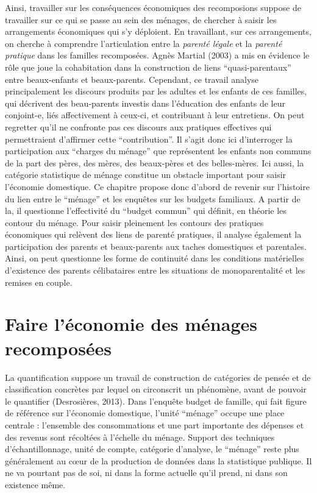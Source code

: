 \documentclass[
  12pt,
]{book}
\begin{document}
Ainsi, travailler sur les conséquences économiques des recomposions
suppose de travailler sur ce qui se passe au sein des ménages, de
chercher à saisir les arrangements économiques qui s'y déploient. En
travaillant, sur ces arrangements, on cherche à comprendre
l'articulation entre la \emph{parenté légale} et la \emph{parenté
pratique} dans les familles recomposées. Agnès Martial (2003) a mis en
évidence le rôle que joue la cohabitation dans la construction de liens
``quasi-parentaux'' entre beaux-enfants et beaux-parents. Cependant, ce
travail analyse principalement les discours produits par les adultes et
les enfants de ces familles, qui décrivent des beau-parents investis
dans l'éducation des enfants de leur conjoint-e, liés affectivement à
ceux-ci, et contribuant à leur entretiens. On peut regretter qu'il ne
confronte pas ces discours aux pratiques effectives qui permettraient
d'affirmer cette ``contribution''. Il s'agit donc ici d'interroger la
participation aux ``charges du ménage'' que représentent les enfants non
communs de la part des pères, des mères, des beaux-pères et des
belles-mères. Ici aussi, la catégorie statistique de ménage constitue un
obstacle important pour saisir l'économie domestique. Ce chapitre
propose donc d'abord de revenir sur l'histoire du lien entre le
``ménage'' et les enquêtes sur les budgets familiaux. A partir de la, il
questionne l'effectivité du ``budget commun'' qui définit, en théorie
les contour du ménage. Pour saisir pleinement les contours des pratiques
économiques qui relèvent des liens de parenté pratiques, il analyse
également la participation des parents et beaux-parents aux taches
domestiques et parentales. Ainsi, on peut questionne les forme de
continuité dans les conditions matérielles d'existence des parents
célibataires entre les situations de monoparentalité et les remises en
couple.

\section{Faire l'économie des ménages
recomposées}\label{faire-luxe9conomie-des-muxe9nages-recomposuxe9es}

La quantification suppose un travail de construction de catégories de
pensée et de classification concrètes par lequel on circonscrit un
phénomène, avant de pouvoir le quantifier (Desrosières, 2013). Dans
l'enquête budget de famille, qui fait figure de référence sur l'économie
domestique, l'unité ``ménage'' occupe une place centrale : l'ensemble
des consommations et une part importante des dépenses et des revenus
sont récoltées à l'échelle du ménage. Support des techniques
d'échantillonnage, unité de compte, catégorie d'analyse, le ``ménage''
reste plus généralement au cœur de la production de données dans la
statistique publique. Il ne va pourtant pas de soi, ni dans la forme
actuelle qu'il prend, ni dans son existence même.
\end{document}
